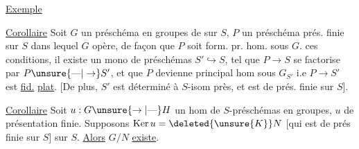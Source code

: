 
\uline{Exemple}

\uline{Corollaire} Soit $G$ un préschéma en groupes de   sur $S$,  $P$ un  préschéma  prés. finie sur $S$ dans lequel $G$ opère, de façon que $P$ soit form. pr. hom. sous $G$.  ces conditions, il existe un mono de préschémas $S'\hookrightarrow S$, tel que $P\longrightarrow S$ se factorise par $P\unsure{\text{---}|\to}S'$, et que  $P$ devienne  principal hom sous $G_{S'}$ i.e $P\to S'$ est  \uline{fid.} \uline{plat}. [De  plus, $S'$ est  déterminé à $S$-isom près, et est de prés. finie sur $S$].

\uline{Corollaire} Soit $u:G\unsure{\to|\text{---}}H$ un hom de $S$-préschémas en groupes,  $u$ de présentation finie. Supposons $\mathrm{Ker}\,u=\deleted{\unsure{K}}N$ [qui est de prés finie sur $S$]  sur $S$. \uline{Alors}  $G/N$ \uline{existe}.
